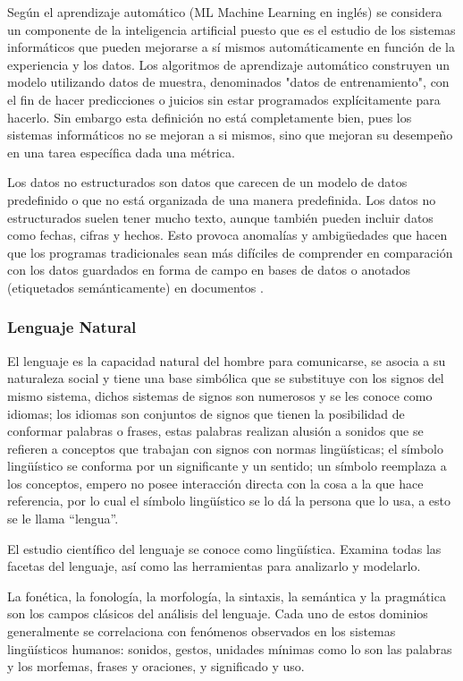 \documentclass[12pt]{article}
\begin{document}
		Según \cite{Siddique2021} el aprendizaje automático (ML Machine Learning en inglés) se considera un componente de la inteligencia artificial puesto que es el estudio de los sistemas informáticos que pueden mejorarse a sí mismos automáticamente en función de la experiencia y los datos. Los algoritmos de aprendizaje automático construyen un modelo utilizando datos de muestra, denominados "datos de entrenamiento", con el fin de hacer predicciones o juicios sin estar programados explícitamente para hacerlo.
		Sin embargo esta definición no está completamente bien, pues los sistemas informáticos no se mejoran a si mismos, sino que mejoran su desempeño en una tarea específica dada una métrica.
	
		Los datos no estructurados son datos que carecen de un modelo de datos predefinido o que no está organizada de una manera predefinida. Los datos no estructurados suelen tener mucho texto, aunque también pueden incluir datos como fechas, cifras y hechos. Esto provoca anomalías y ambigüedades que hacen que los programas tradicionales sean más difíciles de comprender en comparación con los datos guardados en forma de campo en bases de datos o anotados (etiquetados semánticamente) en documentos \cite{Deokar2021}.

		\subsubsection{Lenguaje Natural}
		El lenguaje es la capacidad natural del hombre para comunicarse, se asocia a su naturaleza social y tiene una base simbólica que se substituye con los signos del mismo sistema, dichos sistemas de signos son numerosos y se les conoce como idiomas; los idiomas son conjuntos de signos que tienen la posibilidad de conformar palabras o frases, estas palabras realizan alusión a sonidos que se refieren a conceptos que trabajan con signos con normas lingüísticas; el símbolo lingüístico se conforma por un significante y un sentido; un símbolo reemplaza a los conceptos, empero no posee interacción directa con la cosa a la que hace referencia, por lo cual el símbolo lingüístico se lo dá la persona que lo usa, a esto se le llama ``lengua''. \cite{Pelayo2001}
		
		El estudio científico del lenguaje se conoce como lingüística. Examina todas las facetas del lenguaje, así como las herramientas para analizarlo y modelarlo.\cite{Halliday2003}
		
		La fonética, la fonología, la morfología, la sintaxis, la semántica y la pragmática son los campos clásicos del análisis del lenguaje. Cada uno de estos dominios generalmente se correlaciona con fenómenos observados en los sistemas lingüísticos humanos: sonidos, gestos, unidades mínimas como lo son las palabras y los morfemas, frases y oraciones, y significado y uso.\cite{Akmajian2010}
		
\end{document}
